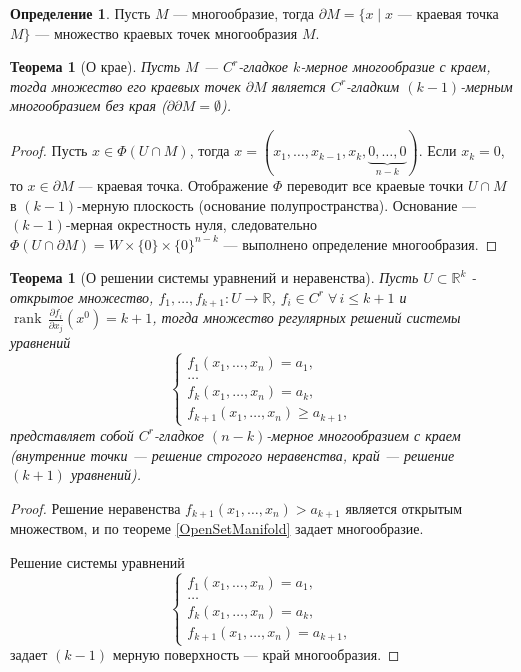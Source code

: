 \documentclass[a5paper]{article}
\newcounter{through}
\theoremstyle{plain}
\newtheorem{theorem}[through]{Теорема}
\theoremstyle{definition}
\newtheorem{definition}[through]{Определение}
\numberwithin{through}{section}
\numberwithin{equation}{section}
\DeclareMathOperator{\rank}{rank}
\begin{document}
\begin{definition}
	Пусть $M$ --- многообразие, тогда $\partial M = \{x \mid x$ --- краевая точка $M\}$ --- множество краевых точек многообразия $M$.
\end{definition}

\begin{theorem}[О крае]
	Пусть $M$ --- $C^r$-гладкое $k$-мерное многообразие с краем, тогда множество его краевых точек $\partial M$ является $C^r$-гладким $(k-1)$-мерным многообразием без края ($\partial \partial M = \emptyset$).
\end{theorem}

\begin{proof}
	Пусть $x \in \Phi(U \cap M)$, тогда $x=(x_1, \ldots, x_{k-1}, x_k, \underbrace{0, \ldots, 0}_{n-k} )$. Если $x_k = 0$, то $x \in \partial M$ --- краевая точка. Отображение $\Phi$ переводит все краевые точки $U \cap M$ в $(k-1)$-мерную плоскость (основание полупространства). Основание --- $(k-1)$-мерная окрестность нуля, следовательно $\Phi(U \cap \partial M) = W \times \{0\} \times \{0\}^{n-k}$ --- выполнено определение многообразия.
\end{proof}

\begin{theorem}[О решении системы уравнений и неравенства]
	Пусть $U \subset \mathbb{R}^k$ - открытое множество, $f_1, \ldots, f_{k+1} : 
	U \to \mathbb{R}$, $f_i \in C^r \; \forall \, i \leq k + 1$ и $\rank \, \frac{\partial f_i}{\partial x_j} (x^0) = k + 1$,  тогда множество регулярных решений системы уравнений
	\begin{equation*}
	\begin{cases}
	f_1(x_1, \ldots, x_n) = a_1,
	\\
	\ldots
	\\
	f_k(x_1, \ldots, x_n) = a_k,
	\\
	f_{k+1}(x_1, \ldots, x_n) \geq a_{k+1},
	\end{cases}
	\end{equation*}
	представляет собой $C^r$-гладкое $(n-k)$-мерное многообразием с краем (внутренние точки --- решение строгого неравенства, край --- решение $(k+1)$ уравнений).
\end{theorem}
\begin{proof}
	Решение неравенства $f_{k+1}(x_1, \ldots, x_n) > a_{k+1}$ является открытым множеством, и по теореме \ref{OpenSetManifold} задает многообразие.
	
	Решение системы уравнений 
	\begin{equation*}
	\begin{cases}
	f_1(x_1, \ldots, x_n) = a_1,
	\\
	\ldots
	\\
	f_k(x_1, \ldots, x_n) = a_k,
	\\
	f_{k+1}(x_1, \ldots, x_n) = a_{k+1},
	\end{cases}
	\end{equation*}
	задает $(k-1)$ мерную поверхность --- край многообразия.
\end{proof}
\end{document}
